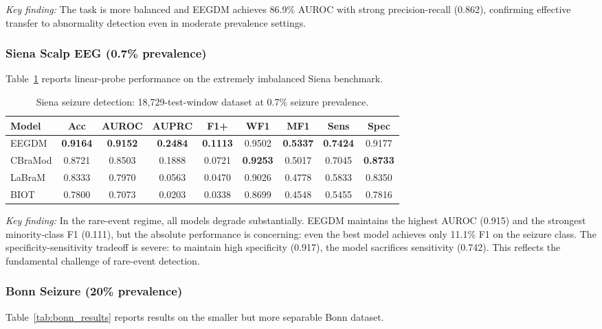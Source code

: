 \documentclass[journal]{IEEEtran}
\newcommand{\best}[1]{\textbf{#1}}
\begin{document}
\textit{Key finding:} The task is more balanced and EEGDM achieves 86.9\% AUROC with strong precision-recall (0.862), confirming effective transfer to abnormality detection even in moderate prevalence settings.

\subsubsection{Siena Scalp EEG (0.7\% prevalence)}

Table~\ref{tab:siena_results} reports linear-probe performance on the extremely imbalanced Siena benchmark.

\begin{table}[t]
\centering
\caption{Siena seizure detection: 18,729-test-window dataset at 0.7\% seizure prevalence.}
\label{tab:siena_results}
\small
\setlength{\tabcolsep}{2.5pt}
\begin{tabular}{@{}lcccccccc@{}}
\toprule
Model & Acc & AUROC & AUPRC & F1+ & WF1 & MF1 & Sens & Spec \\
\midrule
EEGDM & \best{0.9164} & \best{0.9152} & \best{0.2484} & \best{0.1113} & 0.9502 & \best{0.5337} & \best{0.7424} & 0.9177 \\
CBraMod & 0.8721 & 0.8503 & 0.1888 & 0.0721 & \best{0.9253} & 0.5017 & 0.7045 & \best{0.8733} \\
LaBraM & 0.8333 & 0.7970 & 0.0563 & 0.0470 & 0.9026 & 0.4778 & 0.5833 & 0.8350 \\
BIOT & 0.7800 & 0.7073 & 0.0203 & 0.0338 & 0.8699 & 0.4548 & 0.5455 & 0.7816 \\
\bottomrule
\end{tabular}
\end{table}

\textit{Key finding:} In the rare-event regime, all models degrade substantially. EEGDM maintains the highest AUROC (0.915) and the strongest minority-class F1 (0.111), but the absolute performance is concerning: even the best model achieves only 11.1\% F1 on the seizure class. The specificity-sensitivity tradeoff is severe: to maintain high specificity (0.917), the model sacrifices sensitivity (0.742). This reflects the fundamental challenge of rare-event detection.

\subsubsection{Bonn Seizure (20\% prevalence)}

Table~\ref{tab:bonn_results} reports results on the smaller but more separable Bonn dataset.
\end{document}
